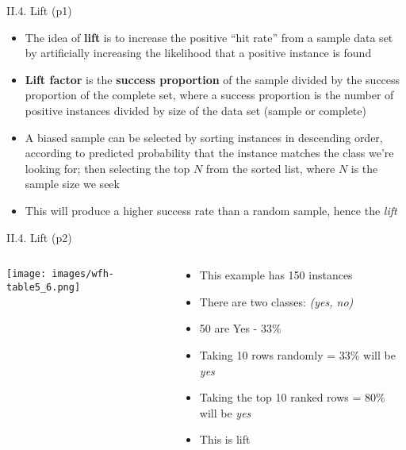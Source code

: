 \documentclass[handout]{beamer}
\newcommand{\strong}[1]{\textbf{\color{teal} #1}}
\newcommand{\stronger}[1]{\textbf{\color{purple} #1}}
\begin{document}
\begin{frame}{II.4. Lift (p1)}
\begin{itemize}
\item The idea of \stronger{lift} is to increase the positive ``hit rate'' from a sample data set by artificially increasing the likelihood that a positive instance is found
\item \stronger{Lift factor} is the \strong{success proportion} of the sample divided by the success proportion of the complete set, where a success proportion is the number of positive instances divided by size of the data set (sample or complete)
\item A biased sample can be selected by sorting instances in descending order, according to predicted probability that the instance matches the class we're looking for; then selecting the top $N$ from the sorted list, where $N$ is the sample size we seek
\item This will produce a higher success rate than a random sample, hence the \emph{lift}
\end{itemize}
\end{frame}
\begin{frame}{II.4. Lift (p2)}
\begin{columns}
\begin{column}{0.4\textwidth}
\texttt{[image: images/wfh-table5\_6.png]}\\
\cite[Table 5.6]{WFH3:2011}
\end{column}
\begin{column}{0.6\textwidth}
\begin{itemize}
\item This example has 150 instances
\item There are two classes: \emph{(yes, no)}
\item 50 are Yes - 33\%
\item Taking 10 rows randomly = 33\% will be \emph{yes}
\item Taking the top 10 ranked rows = 80\% will be \emph{yes}
\item This is lift
\end{itemize}
\end{column}
\end{columns}
\end{frame}
\end{document}

